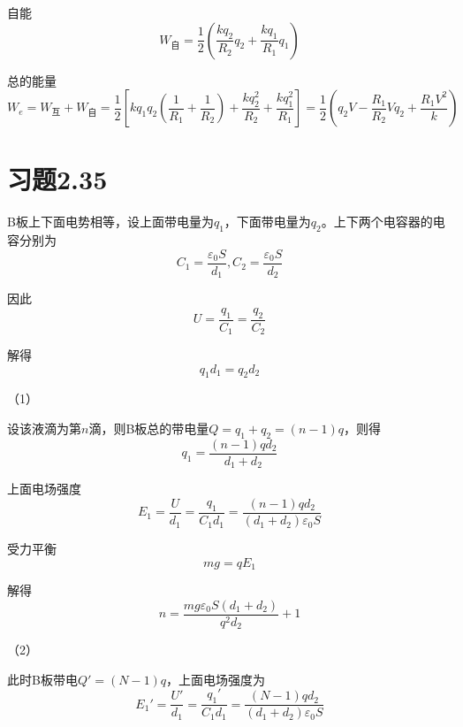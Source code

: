 \documentclass{SCIS2020cn}
\begin{document}
自能
\begin{equation}
    W_{\text{自}}=\frac{1}{2}\left(\frac{kq_2}{R_2}q_2+\frac{kq_1}{R_1}q_1\right)
\end{equation}

总的能量
\begin{equation}
    W_e=W_{\text{互}}+W_{\text{自}}=\frac{1}{2}\left[kq_1q_2\left(\frac{1}{R_1}+\frac{1}{R_2}\right)+\frac{kq_2^2}{R_2}+\frac{kq_1^2}{R_1}\right]=\frac{1}{2}\left(q_2V-\frac{R_1}{R_2}Vq_2+\frac{R_1V^2}{k}\right)
\end{equation}

\section{习题2.35}
B板上下面电势相等，设上面带电量为$q_1$，下面带电量为$q_2$。上下两个电容器的电容分别为
\begin{equation}
    C_1=\frac{\varepsilon_0S}{d_1},C_2=\frac{\varepsilon_0S}{d_2}
\end{equation}

因此
\begin{equation}
    U=\frac{q_1}{C_1}=\frac{q_2}{C_2}
\end{equation}

解得
\begin{equation}
    q_1d_1=q_2d_2
\end{equation}

（1）

设该液滴为第$n$滴，则B板总的带电量$Q=q_1+q_2=(n-1)q$，则得
\begin{equation}
    q_1=\frac{(n-1)qd_2}{d_1+d_2}
\end{equation}

上面电场强度
\begin{equation}
    E_1=\frac{U}{d_1}=\frac{q_1}{C_1d_1}=\frac{(n-1)qd_2}{(d_1+d_2)\varepsilon_0S}
\end{equation}

受力平衡
\begin{equation}
    mg=qE_1
\end{equation}

解得
\begin{equation}
    n=\frac{mg\varepsilon_0S(d_1+d_2)}{q^2d_2}+1
\end{equation}

（2）

此时B板带电$Q'=(N-1)q$，上面电场强度为
\begin{equation}
    E_1'=\frac{U'}{d_1}=\frac{q_1'}{C_1d_1}=\frac{(N-1)qd_2}{(d_1+d_2)\varepsilon_0S}
\end{equation}
\end{document}

